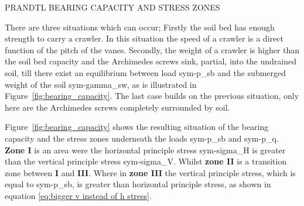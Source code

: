 \begin{RoyalFigure}[!htb, label=fig:bearing_capacity]{PRANDTL BEARING CAPACITY AND STRESS ZONES}
\end{RoyalFigure}

There are three situations which can occur; Firstly the soil bed has enough strength to carry a crawler. In this
situation the speed of a crawler is a direct function of the pitch of the vanes. Secondly, the weight of a crawler is
higher than the soil bed capacity and the Archimedes screws sink, partial, into the undrained soil, till there exist an
equilibrium between load \gls{sym-p_sb} and the submerged weight of the soil \gls{sym-gamma_sw}, as is
illustrated in Figure~\ref{fig:bearing_capacity}. The last case builds on the previous situation, only here are the
Archimedes screws completely surrounded by soil.

Figure~\ref{fig:bearing_capacity} shows the resulting situation of the bearing capacity and the stress zones underneath
the loads \gls{sym-p_sb} and \gls{sym-p_q}. \textbf{Zone I} is an area were the horizontal principle stress
\gls{sym-sigma_H} is greater than the vertical principle stress \gls{sym-sigma_V}. Whilst \textbf{zone II} is a
transition zone between \textbf{I} and \textbf{III}. Where in \textbf{zone III} the vertical principle stress, which is
equal to \gls{sym-p_sb}, is greater than horizontal principle stress, as shown in equation \ref{eq:bigger v instead of h stress}.

